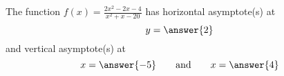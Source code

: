 \documentclass{ximera}
\author{Gregory Hartman \and Matthew Carr}
\begin{document}
\begin{exercise}





The function $f(x)=\frac{2x^2-2x-4}{x^2+x-20}$ has horizontal asymptote(s) at
\[
y= \answer{2}
\]
and vertical asymptote(s) at
\[
x= \answer{-5}\qquad\text{and}\qquad x= \answer{4}
\]
\end{exercise}
\end{document}
